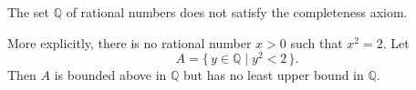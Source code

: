 The set $\mathbb{Q}$ of rational numbers does not satisfy the completeness axiom.
\par
More explicitly, there is no rational number $x > 0$ such that $x^2 = 2$. Let
\begin{equation*}
A = \{\, y \in \mathbb{Q} \mid y^2 < 2 \,\}.
\end{equation*}
Then $A$ is bounded above in $\mathbb{Q}$ but has no least upper bound in $\mathbb{Q}$.
